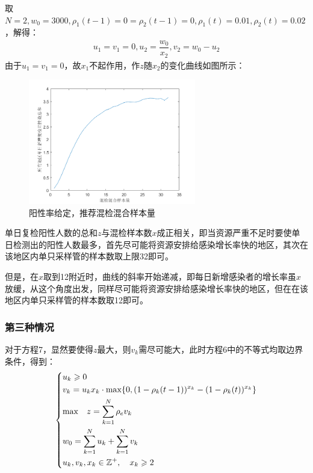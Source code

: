 \documentclass[withoutpreface,bwprint]{cumcmthesis} %
\begin{document}
取$N=2,w_0=3000,\rho_1(t-1)=0=\rho_2(t-1)=0,\rho_1(t)=0.01,\rho_2(t)=0.02$，解得：
\begin{align*}
    u_1=v_1=0, u_2=\dfrac{w_0}{x_2},v_2=w_0-u_2
\end{align*}
由于$u_1=v_1=0$，故$x_1$不起作用，作$z$随$x_2$的变化曲线如图所示：
\begin{figure}[H]
\centering
\includegraphics[width=0.65\textwidth]{fig_pro2.png}
\caption{阳性率给定，推荐混检混合样本量}
\label{pro1}
\end{figure}

单日复检阳性人数的总和$z$与混检样本数$x$成正相关，即当资源严重不足时要使单日检测出的阳性人数最多，首先尽可能将资源安排给感染增长率快的地区，其次在该地区内单只采样管的样本数取上限32即可。

但是，在$x$取到12附近时，曲线的斜率开始递减，即每日新增感染者的增长率虽$x$放缓，从这个角度出发，同样尽可能将资源安排给感染增长率快的地区，但在在该地区内单只采样管的样本数取12即可。

\subsubsection{第三种情况}
对于方程7，显然要使得$z$最大，则$v_k$需尽可能大，此时方程6中的不等式均取边界条件，得到：
\begin{align}
\label{eq2solution1}
    \left\{
    \begin{aligned}
        &u_k \geqslant 0 \\
        &v_k =u_k x_k\cdot {\rm max}
         \{0,(1-\rho_k(t-1))^{x_k}-(1-\rho_k(t))^{x_k} \} \\
        &{\rm max} \quad z = \sum^N_{k=1}\rho_e v_k  \\
        &w_0 =\sum^N_{k=1} u_k +\sum^N_{k=1} v_k  \\
        &u_k,v_k,x_k\in\mathbb{Z^+}, \quad x_k \geqslant 2\\
    \end{aligned}
    \right.
\end{align}
\end{document}
